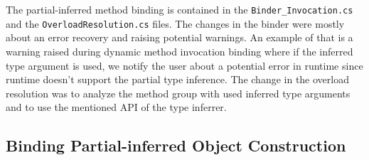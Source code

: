The partial-inferred method binding is contained in the \texttt{Binder\_Invocation.cs} and the \texttt{OverloadResolution.cs} files. 
The changes in the binder were mostly about an error recovery and raising potential warnings. 
An example of that is a warning raised during dynamic method invocation binding where if the inferred type argument is used, we notify the user about a potential error in runtime since runtime doesn’t support the partial type inference. 
The change in the overload resolution was to analyze the method group with used inferred type arguments and to use the mentioned API of the type inferrer.

\subsection{Binding Partial-inferred Object Construction}

